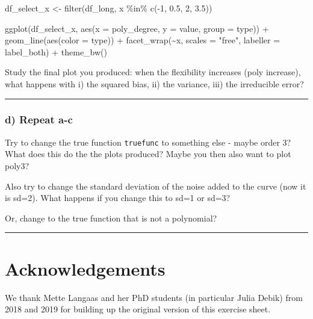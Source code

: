 \documentclass[
]{article}
\newenvironment{Shaded}{\begin{snugshade}}{\end{snugshade}}
\newcommand{\AttributeTok}[1]{\textcolor[rgb]{0.77,0.63,0.00}{#1}}
\newcommand{\DecValTok}[1]{\textcolor[rgb]{0.00,0.00,0.81}{#1}}
\newcommand{\FloatTok}[1]{\textcolor[rgb]{0.00,0.00,0.81}{#1}}
\newcommand{\FunctionTok}[1]{\textcolor[rgb]{0.00,0.00,0.00}{#1}}
\newcommand{\NormalTok}[1]{#1}
\newcommand{\OtherTok}[1]{\textcolor[rgb]{0.56,0.35,0.01}{#1}}
\newcommand{\SpecialCharTok}[1]{\textcolor[rgb]{0.00,0.00,0.00}{#1}}
\newcommand{\StringTok}[1]{\textcolor[rgb]{0.31,0.60,0.02}{#1}}
\begin{document}
\begin{Shaded}
\begin{Highlighting}[]
\NormalTok{df\_select\_x }\OtherTok{\textless{}{-}} \FunctionTok{filter}\NormalTok{(df\_long, x }\SpecialCharTok{\%in\%} \FunctionTok{c}\NormalTok{(}\SpecialCharTok{{-}}\DecValTok{1}\NormalTok{, }\FloatTok{0.5}\NormalTok{, }\DecValTok{2}\NormalTok{, }\FloatTok{3.5}\NormalTok{))}

\FunctionTok{ggplot}\NormalTok{(df\_select\_x, }\FunctionTok{aes}\NormalTok{(}\AttributeTok{x =}\NormalTok{ poly\_degree, }\AttributeTok{y =}\NormalTok{ value, }\AttributeTok{group =}\NormalTok{ type)) }\SpecialCharTok{+}
  \FunctionTok{geom\_line}\NormalTok{(}\FunctionTok{aes}\NormalTok{(}\AttributeTok{color =}\NormalTok{ type)) }\SpecialCharTok{+}
  \FunctionTok{facet\_wrap}\NormalTok{(}\SpecialCharTok{\textasciitilde{}}\NormalTok{x, }\AttributeTok{scales =} \StringTok{"free"}\NormalTok{, }\AttributeTok{labeller =}\NormalTok{ label\_both) }\SpecialCharTok{+}
  \FunctionTok{theme\_bw}\NormalTok{()}
\end{Highlighting}
\end{Shaded}

Study the final plot you produced: when the flexibility increases (poly
increase), what happens with i) the squared bias, ii) the variance, iii)
the irreducible error?

\begin{center}\rule{0.5\linewidth}{0.5pt}\end{center}

\hypertarget{d-repeat-a-c}{%
\subsubsection{d) Repeat a-c}\label{d-repeat-a-c}}

Try to change the true function \texttt{truefunc} to something else -
maybe order 3? What does this do the the plots produced? Maybe you then
also want to plot poly3?

Also try to change the standard deviation of the noise added to the
curve (now it is sd=2). What happens if you change this to sd=1 or sd=3?

Or, change to the true function that is not a polynomial?

\begin{center}\rule{0.5\linewidth}{0.5pt}\end{center}

\hypertarget{acknowledgements}{%
\section{Acknowledgements}\label{acknowledgements}}

We thank Mette Langaas and her PhD students (in particular Julia Debik)
from 2018 and 2019 for building up the original version of this exercise
sheet.
\end{document}
